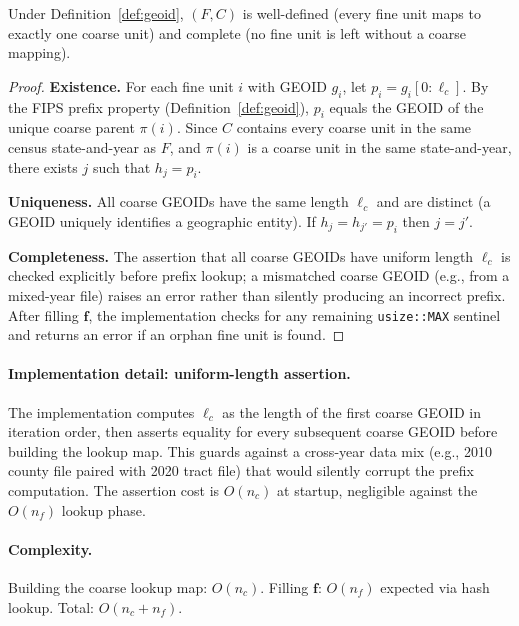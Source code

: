 \begin{theorem}
\label{thm:derive}
Under Definition~\ref{def:geoid}, \derive{}$(F, C)$ is well-defined
(every fine unit maps to exactly one coarse unit) and complete
(no fine unit is left without a coarse mapping).
\end{theorem}

\begin{proof}
\textbf{Existence.}
For each fine unit $i$ with GEOID $g_i$, let $p_i = g_i[0:\ell_c]$.
By the FIPS prefix property (Definition~\ref{def:geoid}), $p_i$ equals
the GEOID of the unique coarse parent $\pi(i)$.
Since $C$ contains every coarse unit in the same census state-and-year
as $F$, and $\pi(i)$ is a coarse unit in the same state-and-year,
there exists $j$ such that $h_j = p_i$.

\textbf{Uniqueness.}
All coarse GEOIDs have the same length $\ell_c$ and are distinct (a GEOID
uniquely identifies a geographic entity).
If $h_j = h_{j'} = p_i$ then $j = j'$.

\textbf{Completeness.}
The assertion that all coarse GEOIDs have uniform length $\ell_c$ is
checked explicitly before prefix lookup; a mismatched coarse GEOID
(e.g., from a mixed-year file) raises an error rather than silently
producing an incorrect prefix.
After filling $\mathbf{f}$, the implementation checks for any remaining
\texttt{usize::MAX} sentinel and returns an error if an orphan fine unit
is found.
\end{proof}

\paragraph{Implementation detail: uniform-length assertion.}
The implementation computes $\ell_c$ as the length of the first coarse
GEOID in iteration order, then asserts equality for every subsequent
coarse GEOID before building the lookup map.
This guards against a cross-year data mix (e.g., 2010 county file paired
with 2020 tract file) that would silently corrupt the prefix computation.
The assertion cost is $O(n_c)$ at startup, negligible against the $O(n_f)$
lookup phase.

\paragraph{Complexity.}
Building the coarse lookup map: $O(n_c)$.
Filling $\mathbf{f}$: $O(n_f)$ expected via hash lookup.
Total: $O(n_c + n_f)$.


